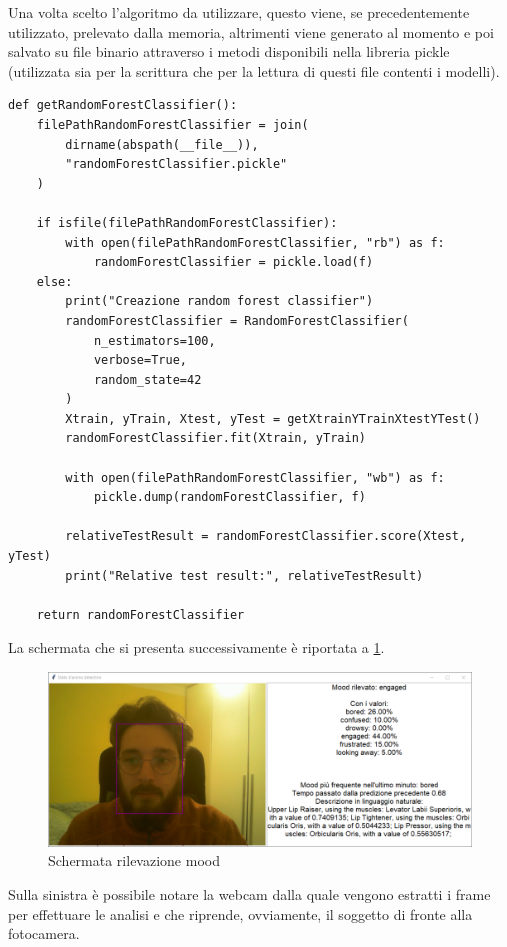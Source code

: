 Una volta scelto l’algoritmo da utilizzare, questo viene, se precedentemente utilizzato, prelevato dalla memoria, altrimenti viene generato al momento e poi salvato su file binario attraverso i metodi disponibili nella libreria pickle (utilizzata sia per la scrittura che per la lettura di questi file contenti i modelli).
\begin{verbatim}
def getRandomForestClassifier():
    filePathRandomForestClassifier = join(
        dirname(abspath(__file__)), 
        "randomForestClassifier.pickle"
    )

    if isfile(filePathRandomForestClassifier):
        with open(filePathRandomForestClassifier, "rb") as f:
            randomForestClassifier = pickle.load(f)
    else:
        print("Creazione random forest classifier")
        randomForestClassifier = RandomForestClassifier(
            n_estimators=100, 
            verbose=True, 
            random_state=42
        )
        Xtrain, yTrain, Xtest, yTest = getXtrainYTrainXtestYTest()
        randomForestClassifier.fit(Xtrain, yTrain)

        with open(filePathRandomForestClassifier, "wb") as f:
            pickle.dump(randomForestClassifier, f)
        
        relativeTestResult = randomForestClassifier.score(Xtest, yTest)
        print("Relative test result:", relativeTestResult)

    return randomForestClassifier
\end{verbatim}
La schermata che si presenta successivamente è riportata a \ref{fig:image17}.
\begin{figure}
    \begin{center}    
        \includegraphics[width=0.9\linewidth]{images/image52.png}
        \caption{Schermata rilevazione mood}
        \label{fig:image17}
    \end{center}
\end{figure}

Sulla sinistra è possibile notare la webcam dalla quale vengono estratti i frame per effettuare le analisi e che riprende, ovviamente, il soggetto di fronte alla fotocamera.

